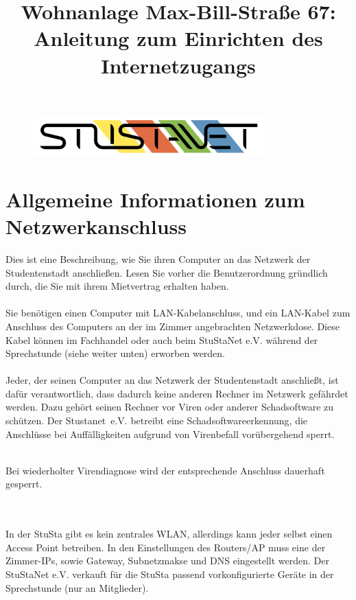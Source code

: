 \documentclass[a4paper,12pt]{scrartcl}
\title{Wohnanlage Max-Bill-Straße 67:\\
       Anleitung zum Einrichten des Internetzugangs}
\begin{document}
\maketitle

\begin{figure}[t!]
   \centering
   \vspace{-20pt}
   \includegraphics[width=0.8\textwidth,keepaspectratio]{Bilder/StuStaNet_Logo}
   \vspace{-40pt}
\end{figure}

\section*{Allgemeine Informationen zum Netzwerkanschluss}

Dies ist eine Beschreibung, wie Sie ihren Computer an das Netzwerk der Studentenstadt anschließen. Lesen Sie vorher die Benutzerordnung gründlich durch, die Sie mit ihrem Mietvertrag erhalten haben.
\\
\\
Sie benötigen einen Computer mit LAN-Kabelanschluss, und ein LAN-Kabel zum Anschluss des Computers an der im Zimmer angebrachten Netzwerkdose. Diese Kabel können im Fachhandel oder auch beim StuStaNet e.V. während der Sprechstunde (siehe weiter unten) erworben werden.
\\
\\
Jeder, der seinen Computer an das Netzwerk der Studentenstadt anschließt, ist dafür verantwortlich, dass dadurch keine anderen Rechner im Netzwerk gefährdet werden. Dazu gehört seinen Rechner vor Viren oder anderer Schadsoftware zu schützen.
Der Stustanet~e.V. betreibt eine Schadsoftwareerkennung, die Anschlüsse bei Auffälligkeiten aufgrund von Virenbefall vorübergehend sperrt.
\\
\begin{bfseries}
	\\Bei wiederholter Virendiagnose wird der entsprechende Anschluss dauerhaft gesperrt.
\end{bfseries}
\\
\\
In der StuSta gibt es kein zentrales WLAN, allerdings kann jeder selbst einen Access Point betreiben. In den Einstellungen des Routers/AP muss eine der Zimmer-IPs, sowie Gateway, Subnetzmakse und DNS eingestellt werden. Der StuStaNet e.V. verkauft für die StuSta passend vorkonfigurierte Geräte in der Sprechstunde (nur an Mitglieder).
\end{document}
